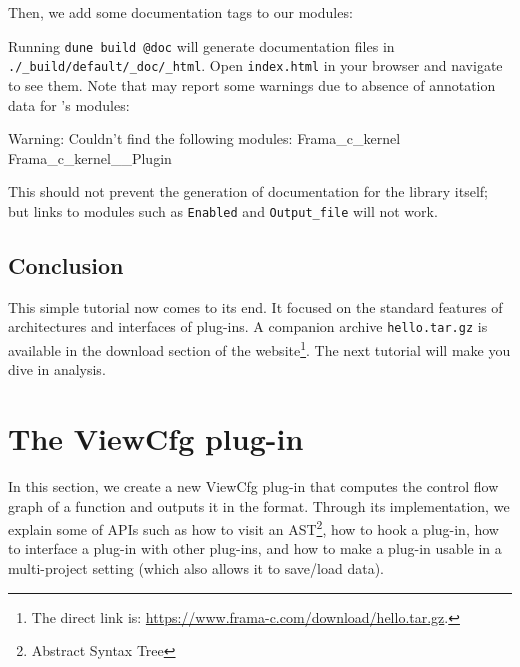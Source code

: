 
Then, we add some documentation tags to our modules:




Running \verb|dune build @doc| will generate documentation files in
\texttt{./\_build/default/\_doc/\_html}. Open \texttt{index.html} in your
browser and navigate to see them. Note that \odoc may report some warnings
due to absence of annotation data for \framac's modules:

\begin{shell}
Warning: Couldn't find the following modules:
  Frama_c_kernel Frama_c_kernel__Plugin
\end{shell}

This should not prevent the generation of documentation for the library itself;
but links to modules such as \texttt{Enabled} and \texttt{Output\_file} will
not work.

\subsection{Conclusion}

This simple tutorial now comes to its end. It focused on the standard features
of architectures and interfaces of \framac plug-ins. A companion archive
\texttt{hello.tar.gz} is available in the download section of the \framac
website\footnote{The direct link is:
\url{https://www.frama-c.com/download/hello.tar.gz}.}.
The next tutorial will make you dive in \C analysis.


\section{The ViewCfg plug-in}\label{tut2:cfg}

In this section, we create a new ViewCfg plug-in that computes the control
flow graph of a function and outputs it in the \dottool format. Through its
implementation, we explain some of \framac APIs such as how to visit
an AST\footnote{Abstract Syntax Tree}, how to hook a plug-in, how to interface
a plug-in with other plug-ins, and how to make a plug-in usable in a
multi-project setting (which also allows it to save/load data).

